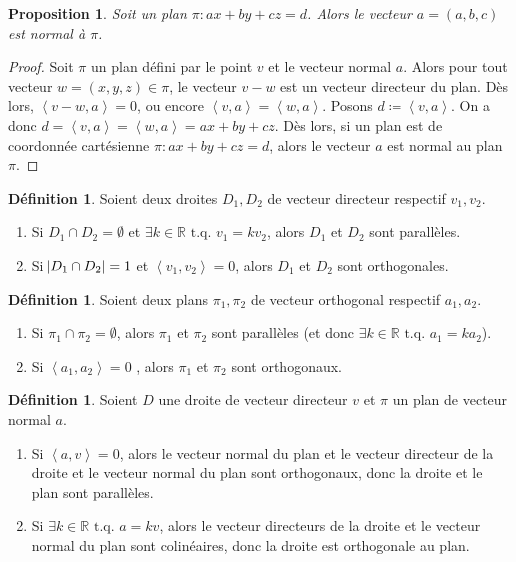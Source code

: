 \documentclass{article}
\newcommand{\R}{\mathbb R}
\newcommand{\scpr}[2]{\left\langle #1, #2\right\rangle}
\newcommand{\tq}{\textrm{ t.q. }}
\newtheorem{prp}[thm]{Proposition}
\theoremstyle{definition}
\newtheorem{déf}[thm]{Définition}
\theoremstyle{remark}
\begin{document}
		\begin{prp} Soit un plan $\pi : ax + by + cz = d$. Alors le vecteur $a = (a, b, c)$ est normal à $\pi$. \end{prp}

		\begin{proof} Soit $\pi$ un plan défini par le point $v$ et le vecteur normal $a$. Alors pour tout vecteur $w = (x, y, z) \in \pi$, le vecteur $v-w$ est un vecteur
		directeur du plan. Dès lors, $\scpr {v-w}a = 0$, ou encore $\scpr va = \scpr wa$. Posons $d \coloneqq \scpr va$. On a donc $d = \scpr va = \scpr wa = ax+by+cz$.
		Dès lors, si un plan est de coordonnée cartésienne $\pi : ax + by + cz = d$, alors le vecteur $a$ est normal au plan $\pi$. \end{proof}

		\begin{déf} Soient deux droites $D_1, D_2$ de vecteur directeur respectif $v_1, v_2$.
		\begin{enumerate}
			\item Si $D_1 \cap D_2 = \emptyset$ et $\exists k \in \R \tq v_1 = kv_2$, alors $D_1$ et $D_2$ sont parallèles.
			\item Si $\abs{D_1 \cap D_2} = 1$ et $\scpr {v_1}{v_2} = 0$, alors $D_1$ et $D_2$ sont orthogonales.
		\end{enumerate}
		\end{déf}

		\begin{déf} Soient deux plans $\pi_1, \pi_2$ de vecteur orthogonal respectif $a_1, a_2$.
		\begin{enumerate}
			\item Si $\pi_1 \cap \pi_2 = \emptyset$, alors $\pi_1$ et $\pi_2$ sont parallèles (et donc $\exists k \in \R \tq a_1 = ka_2$).
			\item Si $\scpr {a_1}{a_2} = 0$ , alors $\pi_1$ et $\pi_2$ sont orthogonaux.
		\end{enumerate}
		\end{déf}

		\begin{déf} Soient $D$ une droite de vecteur directeur $v$ et $\pi$ un plan de vecteur normal $a$.
		\begin{enumerate}
			\item Si $\scpr av = 0$, alors le vecteur normal du plan et le vecteur directeur de la droite et le vecteur normal du plan sont orthogonaux, donc la droite
			      et le plan sont parallèles.
			\item Si $\exists k \in \R \tq a = kv$, alors le vecteur directeurs de la droite et le vecteur normal du plan sont colinéaires, donc la droite est orthogonale
			      au plan.
		\end{enumerate}
		\end{déf}
\end{document}
